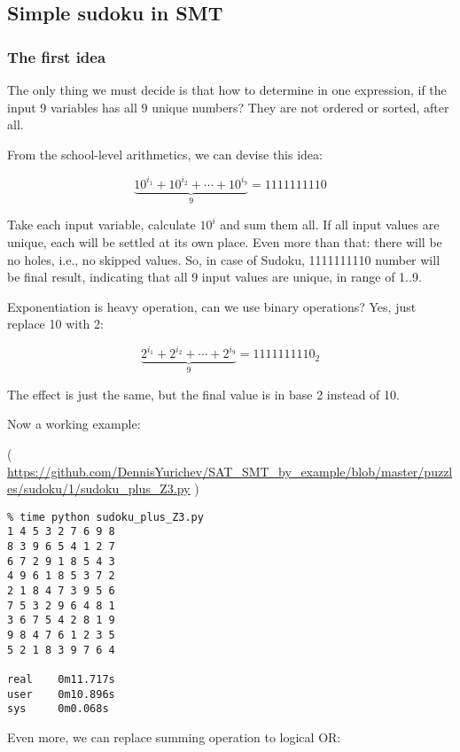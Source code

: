 \subsection{Simple sudoku in SMT}
\label{sudoku_SMT}

\subsubsection{The first idea}

The only thing we must decide is that how to determine in one expression, if the input 9 variables has all 9 unique numbers?
They are not ordered or sorted, after all.

From the school-level arithmetics, we can devise this idea:

\begin{equation}
\underbrace{10^{i_1} + 10^{i_2} + \cdots + 10^{i_9}}_9 = 1111111110
\end{equation}

Take each input variable, calculate $10^i$ and sum them all.
If all input values are unique, each will be settled at its own place.
Even more than that: there will be no holes, i.e., no skipped values.
So, in case of Sudoku, 1111111110 number will be final result, indicating that all 9 input values are unique, in range of 1..9.

Exponentiation is heavy operation, can we use binary operations? Yes, just replace 10 with 2:

\begin{equation}
\underbrace{2^{i_1} + 2^{i_2} + \cdots + 2^{i_9}}_9 = 1111111110_2
\end{equation}

The effect is just the same, but the final value is in base 2 instead of 10.

Now a working example:


( \url{https://github.com/DennisYurichev/SAT_SMT_by_example/blob/master/puzzles/sudoku/1/sudoku_plus_Z3.py} )

\begin{lstlisting}
% time python sudoku_plus_Z3.py
1 4 5 3 2 7 6 9 8
8 3 9 6 5 4 1 2 7
6 7 2 9 1 8 5 4 3
4 9 6 1 8 5 3 7 2
2 1 8 4 7 3 9 5 6
7 5 3 2 9 6 4 8 1
3 6 7 5 4 2 8 1 9
9 8 4 7 6 1 2 3 5
5 2 1 8 3 9 7 6 4

real    0m11.717s
user    0m10.896s
sys     0m0.068s
\end{lstlisting}

Even more, we can replace summing operation to logical OR:

